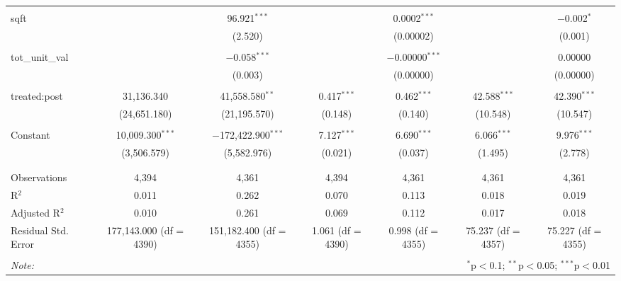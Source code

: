\begin{table}[H]
{\begin{tabular}{@{\extracolsep{5pt}}lcccccc}
   & & & & & & \\  

  sqft &  & 96.921$^{***}$ &  & 0.0002$^{***}$ &  & $-$0.002$^{*}$ \\  

   &  & (2.520) &  & (0.00002) &  & (0.001) \\  

   & & & & & & \\  

  tot\_unit\_val &  & $-$0.058$^{***}$ &  & $-$0.00000$^{***}$ &  & 0.00000 \\  

   &  & (0.003) &  & (0.00000) &  & (0.00000) \\  

   & & & & & & \\  

  treated:post & 31,136.340 & 41,558.580$^{**}$ & 0.417$^{***}$ & 0.462$^{***}$ & 42.588$^{***}$ & 42.390$^{***}$ \\  

   & (24,651.180) & (21,195.570) & (0.148) & (0.140) & (10.548) & (10.547) \\  

   & & & & & & \\  

  Constant & 10,009.300$^{***}$ & $-$172,422.900$^{***}$ & 7.127$^{***}$ & 6.690$^{***}$ & 6.066$^{***}$ & 9.976$^{***}$ \\  

   & (3,506.579) & (5,582.976) & (0.021) & (0.037) & (1.495) & (2.778) \\  

   & & & & & & \\  

 \hline \\[-1.8ex]  

 Observations & 4,394 & 4,361 & 4,394 & 4,361 & 4,361 & 4,361 \\  

 R$^{2}$ & 0.011 & 0.262 & 0.070 & 0.113 & 0.018 & 0.019 \\  

 Adjusted R$^{2}$ & 0.010 & 0.261 & 0.069 & 0.112 & 0.017 & 0.018 \\  

 Residual Std. Error & 177,143.000 (df = 4390) & 151,182.400 (df = 4355) & 1.061 (df = 4390) & 0.998 (df = 4355) & 75.237 (df = 4357) & 75.227 (df = 4355) \\  

 \hline  

 \hline \\[-1.8ex]  

 \textit{Note:}  & \multicolumn{6}{r}{$^{*}$p$<$0.1; $^{**}$p$<$0.05; $^{***}$p$<$0.01} \\  

 \end{tabular}}  

 \end{table}  

